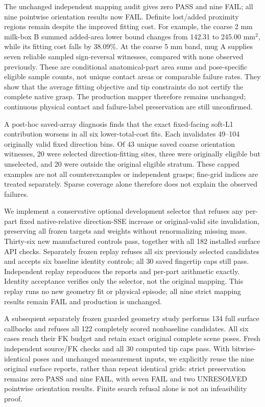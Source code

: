 \documentclass[10pt,letterpaper]{article}
\begin{document}
The unchanged independent mapping audit gives zero PASS and nine FAIL; all
nine pointwise orientation results now FAIL. Definite lost/added proximity
regions remain despite the improved fitting cost. For example, the coarse
2 mm milk-box B summed added-area lower bound changes from 142.31 to
245.00 mm$^2$, while its fitting cost falls by 38.09\%. At the coarse 5 mm
band, mug A supplies seven reliable sampled sign-reversal witnesses, compared
with none observed previously. These are conditional anatomical-part area
sums and pose-specific eligible sample counts, not unique contact areas or
comparable failure rates. They show that the average fitting objective and
tip constraints do not certify the complete native grasp. The production
mapper therefore remains unchanged; continuous physical contact and
failure-label preservation are still unconfirmed.

A post-hoc saved-array diagnosis finds that the exact fixed-facing soft-L1
contribution worsens in all six lower-total-cost fits. Each invalidates
49--104 originally valid fixed direction bins. Of 43 unique saved coarse
orientation witnesses, 20 were selected direction-fitting sites, three were
originally eligible but unselected, and 20 were outside the original eligible
stratum. These capped examples are not all counterexamples or independent
grasps; fine-grid indices are treated separately. Sparse coverage alone
therefore does not explain the observed failures.

We implement a conservative optional development selector that refuses any
per-part fixed native-relative direction-SSE increase or original-valid site
invalidation, preserving all frozen targets and weights without renormalizing
missing mass. Thirty-six new manufactured controls pass, together with all
182 installed surface API checks. Separately frozen replay refuses all six
previously selected candidates and accepts six baseline identity controls;
all 30 saved fingertip caps still pass. Independent replay reproduces the
reports and per-part arithmetic exactly. Identity acceptance verifies only
the selector, not the original mapping. This replay runs no new geometry fit or physical episode; all nine strict
mapping results remain FAIL and production is unchanged.

A subsequent separately frozen guarded geometry study performs 134 full
surface callbacks and refuses all 122 completely scored nonbaseline
candidates. All six cases reach their FK budget and retain exact original
complete scene poses. Fresh independent source/FK checks and all 30 computed
tip caps pass. With bitwise-identical poses and unchanged measurement inputs, we explicitly
reuse the nine original surface reports, rather than repeat identical grids:
strict preservation remains zero PASS and nine FAIL, with seven FAIL and two
UNRESOLVED pointwise orientation results. Finite search refusal alone is not
an infeasibility proof.
\end{document}
